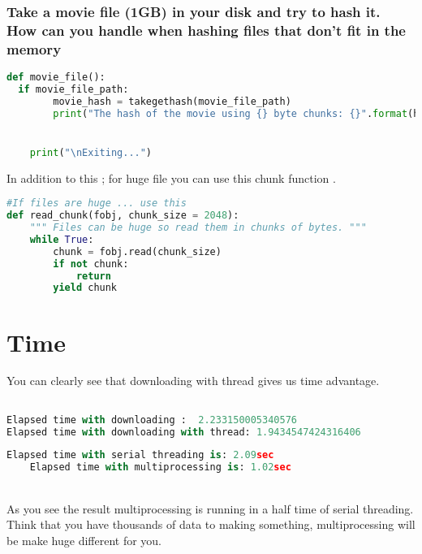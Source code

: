 \documentclass[onecolumn]{article}
\begin{document}
\subsubsection{Take a movie file (1GB) in your disk and try to hash it. How can you handle when hashing files that don't fit in the memory}

\begin{lstlisting}[language=Python, caption= Downloading huge data ]
def movie_file():
  if movie_file_path:
        movie_hash = takegethash(movie_file_path)
        print("The hash of the movie using {} byte chunks: {}".format(hash_buffer_size, movie_hash))


    print("\nExiting...")

    \end{lstlisting}
    
    In addition to this ;  for huge file you can use this chunk  function .
    
    \begin{lstlisting}[language=Python, caption= Chunk is for huge files ]
    #If files are huge ... use this
def read_chunk(fobj, chunk_size = 2048):
    """ Files can be huge so read them in chunks of bytes. """
    while True:
        chunk = fobj.read(chunk_size)
        if not chunk:
            return
        yield chunk
        \end{lstlisting}

\section{Time}

You can clearly see that downloading with thread gives us time advantage.

\begin{lstlisting}[language=Python, caption=Output Comparing Downloading Process ]

Elapsed time with downloading :  2.233150005340576 
Elapsed time with downloading with thread: 1.9434547424316406 

\end{lstlisting}



\begin{lstlisting}[language=Python, caption=Output of difference]
    Elapsed time with serial threading is: 2.09sec
    Elapsed time with multiprocessing is: 1.02sec
\end{lstlisting}

\\As you see the result multiprocessing is running in a half time of serial threading. Think that you have thousands of data to making something, multiprocessing will be make huge different for you.
\end{document}
